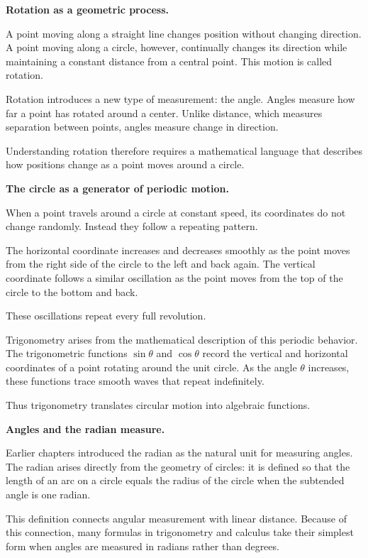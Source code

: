 \documentclass[11pt, openany]{book}
\theoremstyle{plain}
\theoremstyle{definition}
\theoremstyle{remark}
\begin{document}
\medskip

\textbf{Rotation as a geometric process.}

A point moving along a straight line changes position without changing
direction. A point moving along a circle, however, continually changes
its direction while maintaining a constant distance from a central
point. This motion is called rotation.

Rotation introduces a new type of measurement: the angle. Angles measure
how far a point has rotated around a center. Unlike distance, which
measures separation between points, angles measure change in direction.

Understanding rotation therefore requires a mathematical language that
describes how positions change as a point moves around a circle.

\medskip

\textbf{The circle as a generator of periodic motion.}

When a point travels around a circle at constant speed, its coordinates
do not change randomly. Instead they follow a repeating pattern.

The horizontal coordinate increases and decreases smoothly as the point
moves from the right side of the circle to the left and back again. The
vertical coordinate follows a similar oscillation as the point moves
from the top of the circle to the bottom and back.

These oscillations repeat every full revolution.

Trigonometry arises from the mathematical description of this periodic
behavior. The trigonometric functions $\sin\theta$ and $\cos\theta$
record the vertical and horizontal coordinates of a point rotating
around the unit circle. As the angle $\theta$ increases, these functions
trace smooth waves that repeat indefinitely.

Thus trigonometry translates circular motion into algebraic functions.

\medskip

\textbf{Angles and the radian measure.}

Earlier chapters introduced the radian as the natural unit for measuring
angles. The radian arises directly from the geometry of circles: it is
defined so that the length of an arc on a circle equals the radius of
the circle when the subtended angle is one radian.

This definition connects angular measurement with linear distance.
Because of this connection, many formulas in trigonometry and calculus
take their simplest form when angles are measured in radians rather than
degrees.
\end{document}
